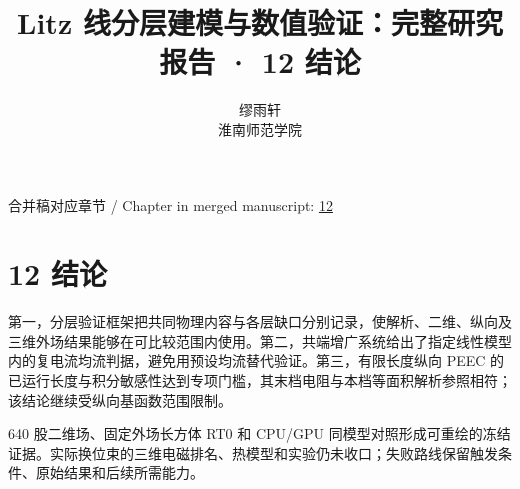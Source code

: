 \documentclass[11pt]{article}
\begin{document}
\title{Litz 线分层建模与数值验证：完整研究报告 · 12 结论}
\author{缪雨轩\\淮南师范学院}
\date{}
\maketitle
\noindent 合并稿对应章节 / Chapter in merged manuscript: \href{report_zh-CN_single.pdf#chapter-12}{12}\par
\FloatBarrier
\section*{12 结论}
\hypertarget{chapter-12}{}
第一，分层验证框架把共同物理内容与各层缺口分别记录，使解析、二维、纵向及三维外场结果能够在可比较范围内使用。第二，共端增广系统给出了指定线性模型内的复电流均流判据，避免用预设均流替代验证。第三，有限长度纵向 PEEC 的已运行长度与积分敏感性达到专项门槛，其末档电阻与本档等面积解析参照相符；该结论继续受纵向基函数范围限制。


640 股二维场、固定外场长方体 RT0 和 CPU/GPU 同模型对照形成可重绘的冻结证据。实际换位束的三维电磁排名、热模型和实验仍未收口；失败路线保留触发条件、原始结果和后续所需能力。
\end{document}

